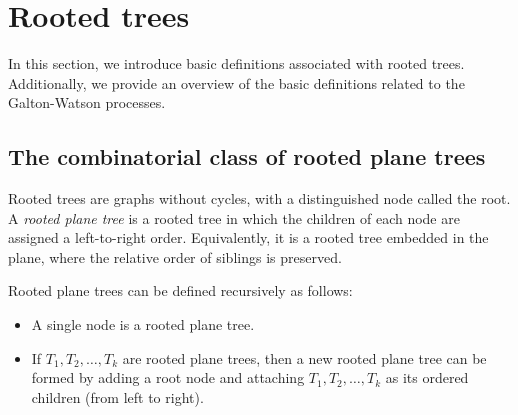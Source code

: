 \documentclass[11pt,a4paper,leqno]{amsart}
\theoremstyle{plain}
\theoremstyle{definition}
\numberwithin{equation}{section}
\def\D{\mathbb{D}}
\def\K{\mathcal{K}}
\begin{document}
	
	
	
	\section{Rooted trees}
	
	In this section, we introduce basic definitions associated with rooted trees. Additionally, we provide an overview of the basic definitions related to the Galton-Watson processes.
	
	\subsection{The combinatorial class of rooted plane trees}
	
	Rooted trees are graphs without cycles, with a distinguished node called the root. A \textit{rooted plane tree} is a rooted tree in which the children of each node are assigned a left-to-right order. Equivalently, it is a rooted tree embedded in the plane, where the relative order of siblings is preserved.  
	\smallskip
	
	Rooted plane trees can be defined recursively as follows:  
	\begin{itemize}
		\item A single node is a rooted plane tree.
		\item If \( T_1, T_2, \dots, T_k \) are rooted plane trees, then a new rooted plane tree can be formed by adding a root node and attaching \( T_1, T_2, \dots, T_k \) as its ordered children (from left to right).
	\end{itemize}
	
\end{document}
